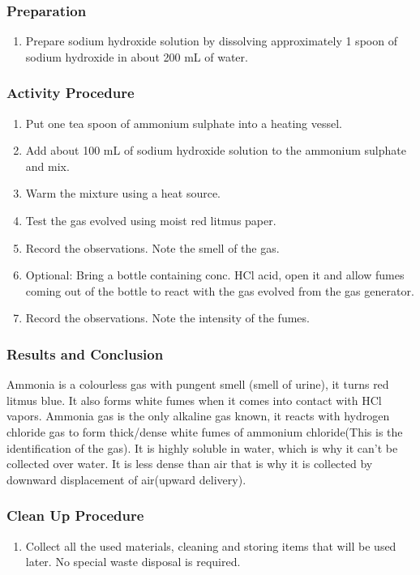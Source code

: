 \subsubsection*{Preparation}
\begin{enumerate}
\item{Prepare sodium hydroxide solution by dissolving approximately 1 spoon of sodium hydroxide in about 200 mL of water.}
\end{enumerate}

\subsubsection*{Activity Procedure}
\begin{enumerate}
\item{Put one tea spoon of ammonium sulphate into a heating vessel.}
\item{Add about 100 mL of sodium hydroxide solution to the ammonium sulphate and mix.}
\item{Warm the mixture using a heat source.}
\item{Test the gas evolved using moist red litmus paper.}
\item{Record the observations. Note the smell of the gas.}
\item{Optional: Bring a bottle containing conc. HCl acid, open it and allow fumes coming out of the bottle to react with the gas evolved from the gas generator.}
\item{Record the observations. Note the intensity of the fumes.}
\end{enumerate}

\subsubsection*{Results and Conclusion}
Ammonia is a colourless gas with pungent smell (smell of urine), it turns red litmus blue. It also forms white fumes when it comes into contact with HCl vapors.
Ammonia gas is the only alkaline gas known, it reacts with hydrogen chloride gas to form thick/dense white fumes of ammonium chloride(This is the identification of the gas). It is highly soluble in water, which is why it can't be collected over water. It is less dense than air that is why it is collected by downward displacement of air(upward delivery).

\subsubsection*{Clean Up Procedure}
\begin{enumerate}
\item{Collect all the used materials, cleaning and storing items that will be used later. No special waste disposal is required.}
\end{enumerate}

